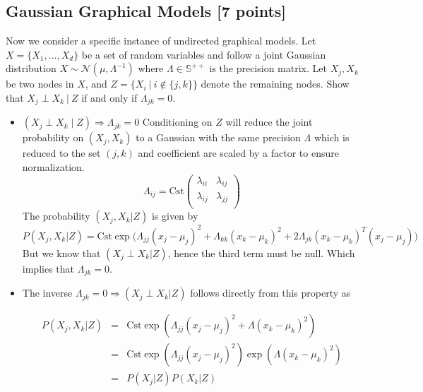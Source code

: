 \documentclass[12pt]{article} \usepackage[utf8]{inputenc}
\begin{document}
\subsection{Gaussian Graphical Models [7 points]}

Now we consider a specific instance of undirected graphical models. Let $X = \{ X_1, ..., X_d \}$ be a set of random variables and follow a joint Gaussian distribution $X \sim \mathcal{N}(\mu, \Lambda^{-1})$ where $\Lambda \in \mathbb{S}^{++}$ is the precision matrix. Let $X_j,X_k$ be two nodes in $X$, and $Z = \{X_i \ | \ i \notin \{j,k\}\}$ denote the remaining nodes. Show that $X_j \perp X_k \ | \ Z$ if and only if $\Lambda_{jk} = 0$.

\begin{solution}
  \begin{itemize}
    \item $(X_j \perp X_k\;|\;Z) \Longrightarrow
      \Lambda_{jk}=0$
      Conditioning on $Z$ will reduce the joint probability on
      $(X_j, X_k)$ to a Gaussian with the same precision $\Lambda$ which
      is reduced to the set $(j,k)$ and coefficient are scaled by a
      factor to ensure normalization.
      \[
        \Lambda_{ij}= \text{Cst} \begin{pmatrix} \lambda_{ii} &
          \lambda_{ij}\\
          \lambda_{ij} & \lambda_{jj}\\
        \end{pmatrix}
      \]
    The probability $(X_j, X_k|Z)$ is given by 
    \[
      P(X_j,X_k|Z) = \text{Cst}\exp\big(\Lambda_{jj}(x_j - \mu_j)^2 + 
      \Lambda_{kk} (x_k - \mu_k)^2
      + 2\Lambda_{jk}(x_k-\mu_k)^T(x_j-\mu_j)
    \big)
    \]
    But we know that $(X_j\perp X_k|Z)$, hence the third term must be
    null. Which implies that $\Lambda_{jk}= 0.$
  \item  The inverse $\Lambda_{jk}=0\Longrightarrow (X_j \perp X_k | Z)$
    follows directly from this property as

    \begin{eqnarray}
      P(X_j, X_k|Z) &=& \text{Cst}\exp (\Lambda_{jj}(x_j-\mu_j)^2 +
    \Lambda(x_k -\mu_k)^2) \\
                    &=&
                    \text{Cst}\exp(\Lambda_{jj}(x_j-\mu_j)^2)
                    \exp( \Lambda(x_k -\mu_k)^2)\\
                    &=& P(X_j|Z)P(X_k|Z)
  \end{eqnarray}
  \end{itemize}
\end{solution}
\end{document}
